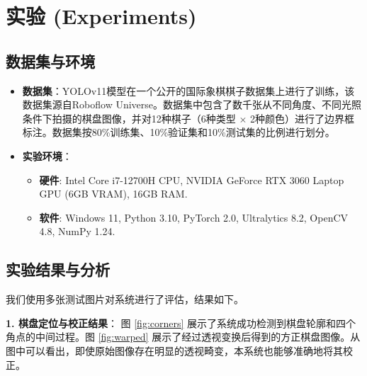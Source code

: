 \documentclass[12pt, a4paper]{article}
\begin{document}
\section{实验 (Experiments)}

\subsection{数据集与环境}
\begin{itemize}
    \item \textbf{数据集}：YOLOv11模型在一个公开的国际象棋棋子数据集上进行了训练，该数据集源自Roboflow Universe。数据集中包含了数千张从不同角度、不同光照条件下拍摄的棋盘图像，并对12种棋子（6种类型 $\times$ 2种颜色）进行了边界框标注。数据集按80\%训练集、10\%验证集和10\%测试集的比例进行划分。
    \item \textbf{实验环境}：
        \begin{itemize}
            \item \textbf{硬件}: Intel Core i7-12700H CPU, NVIDIA GeForce RTX 3060 Laptop GPU (6GB VRAM), 16GB RAM.
            \item \textbf{软件}: Windows 11, Python 3.10, PyTorch 2.0, Ultralytics 8.2, OpenCV 4.8, NumPy 1.24.
        \end{itemize}
\end{itemize}

\subsection{实验结果与分析}
我们使用多张测试图片对系统进行了评估，结果如下。

\textbf{1. 棋盘定位与校正结果}：
图 \ref{fig:corners} 展示了系统成功检测到棋盘轮廓和四个角点的中间过程。图 \ref{fig:warped} 展示了经过透视变换后得到的方正棋盘图像。从图中可以看出，即使原始图像存在明显的透视畸变，本系统也能够准确地将其校正。
\end{document}
